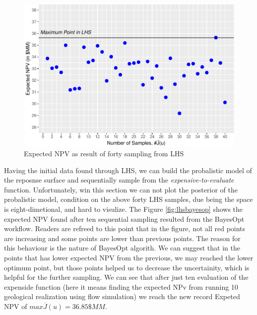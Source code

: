 \documentclass[]{elsarticle} %
\begin{document}
\begin{figure}

{\centering \includegraphics[width=468px]{0_Paper1_main_files/figure-latex/lhssampling-1} 

}

\caption{Expected NPV as result of forty sampling from LHS}\label{fig:lhssampling}
\end{figure}

Having the initial data found through LHS, we can build the probalistic model of the reposnse surface and sequentially sample from the \emph{expensive-to-evaluate} function. Unfortunately, win this section we can not plot the posterior of the probalistic model, condition on the above forty LHS samples, due being the space is eight-dimetional, and hard to visulize. The Figure \ref{fig:lhsbayesop} shows the expected NPV found after ten sequential sampling resulted from the BayesOpt workflow. Readers are refreed to this point that in the figure, not all red points are increasing and some points are lower than previous points. The reason for this behaviour is the nature of BayesOpt algorith. We can suggest that in the points that has lower expected NPV from the previous, we may reached the lower optimum point, but those points helped us to decrease the uncertainity, which is helpful for the further sampling. We can see that after just ten evaluation of the expenside function (here it means finding the expected NPv from running 10 geological realization using flow simulation) we reach the new record Expeted NPV of \(max \overline{J}(u)=36.85\)\(\$MM\).
\end{document}
